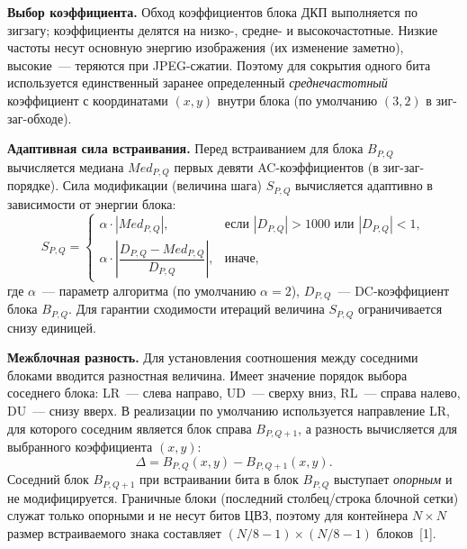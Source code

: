 \documentclass[12pt,a4paper]{article}
\begin{document}
\textbf{Выбор коэффициента.} Обход коэффициентов блока ДКП выполняется по зигзагу; коэффициенты делятся на низко-, средне- и высокочастотные. Низкие частоты несут основную энергию изображения (их изменение заметно), высокие~--- теряются при JPEG-сжатии. Поэтому для сокрытия одного бита используется единственный заранее определенный \textit{среднечастотный} коэффициент с координатами $(x, y)$ внутри блока (по умолчанию $(3, 2)$ в зиг-заг-обходе).

\textbf{Адаптивная сила встраивания.} Перед встраиванием для блока $B_{P,Q}$ вычисляется медиана $\mathit{Med}_{P,Q}$ первых девяти AC-коэффициентов (в зиг-заг-порядке). Сила модификации (величина шага) $S_{P,Q}$ вычисляется адаптивно в зависимости от энергии блока:
\begin{equation}
S_{P,Q} =
\begin{cases}
\alpha \cdot |\mathit{Med}_{P,Q}|, & \text{если } |D_{P,Q}| > 1000 \text{ или } |D_{P,Q}| < 1,\\[4pt]
\alpha \cdot \left| \dfrac{D_{P,Q} - \mathit{Med}_{P,Q}}{D_{P,Q}} \right|, & \text{иначе,}
\end{cases}
\end{equation}
где $\alpha$~--- параметр алгоритма (по умолчанию $\alpha = 2$), $D_{P,Q}$~--- DC-коэффициент блока $B_{P,Q}$. Для гарантии сходимости итераций величина $S_{P,Q}$ ограничивается снизу единицей.

\textbf{Межблочная разность.} Для установления соотношения между соседними блоками вводится разностная величина. Имеет значение порядок выбора соседнего блока: LR~--- слева направо, UD~--- сверху вниз, RL~--- справа налево, DU~--- снизу вверх. В реализации по умолчанию используется направление LR, для которого соседним является блок справа $B_{P,Q+1}$, а разность вычисляется для выбранного коэффициента $(x, y)$:
\begin{equation}
\Delta = B_{P,Q}(x, y) - B_{P,Q+1}(x, y).
\end{equation}
Соседний блок $B_{P,Q+1}$ при встраивании бита в блок $B_{P,Q}$ выступает \textit{опорным} и не модифицируется. Граничные блоки (последний столбец/строка блочной сетки) служат только опорными и не несут битов ЦВЗ, поэтому для контейнера $N \times N$ размер встраиваемого знака составляет $(N/8 - 1) \times (N/8 - 1)$ блоков~[1].
\end{document}
